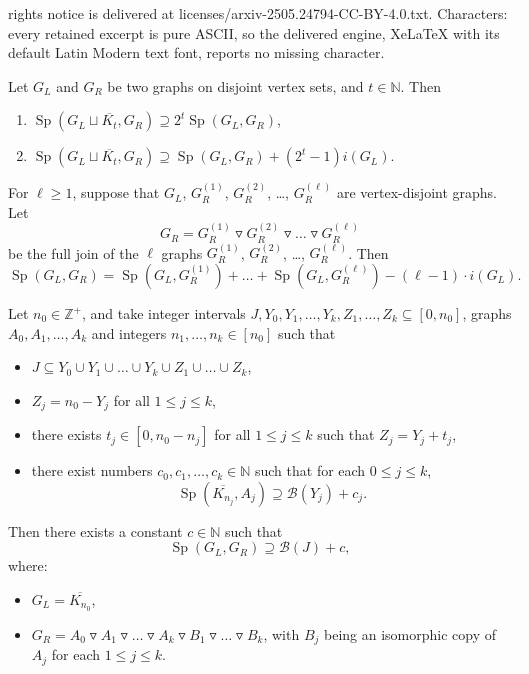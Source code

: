 \documentclass[10pt,a4paper]{amsart}
\DeclareMathOperator{\Sp}{Sp}
\newcommand{\cB}{\mathcal{B}}
\newcommand{\nn}{\mathbb{N}}
\newcommand{\zz}{\mathbb{Z}}
\begin{document}
rights notice is delivered at licenses/arxiv-2505.24794-CC-BY-4.0.txt. Characters: every retained excerpt is pure ASCII, so the delivered engine, XeLaTeX with its default Latin Modern text font, reports no missing character.
\begin{lemma}\label{lem:spectrumscaling}
Let $G_L$ and $G_R$ be two graphs on disjoint vertex sets, and $t\in \nn$. Then
\begin{enumerate}[label=(\alph*)]
\item $\Sp(G_L\sqcup \overline{K_t}, G_R)\supseteq 2^t\Sp(G_L, G_R)$,
\item $\Sp(G_L\sqcup \overline{K_t}, G_R) \supseteq \Sp(G_L, G_R) + (2^t-1)i(G_L)$.
\end{enumerate}
\end{lemma}

\begin{lemma}\label{lem:join_with_multiple}
For $\ell\ge 1$, suppose that $G_L$, $G^{(1)}_R$, $G^{(2)}_R$, \dots, $G^{(\ell)}_R$ are vertex-disjoint graphs. Let 
$$G_R=G^{(1)}_R\triangledown G^{(2)}_R \triangledown \dots\triangledown G^{(\ell)}_R$$ be the full join of the $\ell$ graphs $G^{(1)}_R$, $G^{(2)}_R$, \dots, $G^{(\ell)}_R$. Then
$$\Sp(G_L,G_R)=\Sp(G_L,G^{(1)}_R) + \ldots + \Sp(G_L,G^{(\ell)}_R) - (\ell-1)\cdot i(G_L).$$
\end{lemma}

\begin{proposition}\label{prop:combined_skeleton}
Let $n_0\in \zz^{+}$, and take integer intervals $J,Y_0,Y_1,\ldots,Y_k,Z_1,\ldots,Z_k\subseteq [0, n_0]$,  graphs $A_0,A_1,\ldots,A_k$ and integers $n_1, \ldots, n_k\in [n_0]$ such that
\begin{itemize}
\itemsep0em
\item $J\subseteq Y_0\cup Y_1\cup \ldots\cup Y_k\cup Z_1\cup \ldots\cup Z_k$,
\item $Z_j=n_0-Y_j$ for all $1\le j\le k$,
\item there exists $t_j\in [0, n_0-n_j]$ for all $1\le j\le k$ such that $Z_j=Y_j+t_j$,
\item there exist numbers $c_0, c_1, \ldots, c_{k}\in \nn$ such that for each $0\le j\le k$, $$\Sp(\overline{K_{n_j}}, A_j)\supseteq \cB(Y_j)+c_j.$$
\end{itemize}

Then there exists a constant $c\in \nn$ such that $$\Sp(G_L, G_R)\supseteq \cB(J)+c,$$ where:
\begin{itemize}
\itemsep0em
\item $G_L=\overline{K_{n_0}}$,
\item $G_R=A_0\triangledown A_1\triangledown \ldots\triangledown A_k\triangledown B_1\triangledown \ldots\triangledown B_k$, with $B_j$ being an isomorphic copy of $A_j$ for each $1\le j\le k$.
\end{itemize}
\end{proposition}
\end{document}
